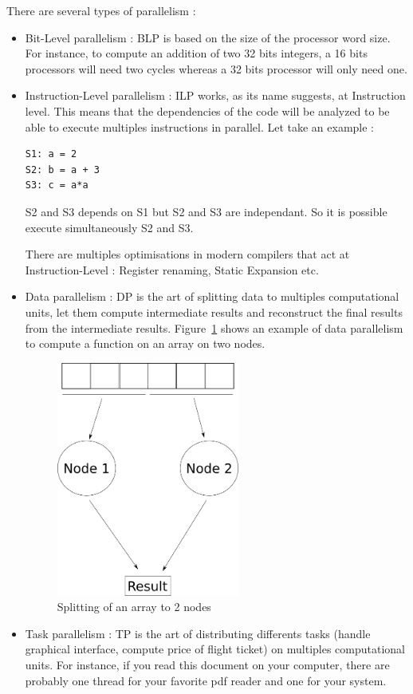 There are several types of parallelism :
\begin{itemize}
\item Bit-Level parallelism : BLP is based on the size of the processor word size. For instance, to compute an addition of two 32 bits integers, a 16 bits processors will need two cycles whereas a 32 bits processor will only need one.
\item Instruction-Level parallelism : ILP works, as its name suggests, at Instruction level. This means that the dependencies of the code will be analyzed to be able to execute multiples instructions in parallel. Let take an example :
\begin{lstlisting}
S1: a = 2
S2: b = a + 3
S3: c = a*a
\end{lstlisting}
S2 and S3 depends on S1 but S2 and S3 are independant. So it is possible execute simultaneously S2 and S3.

There are multiples optimisations in modern compilers that act at Instruction-Level : Register renaming, Static Expansion etc.
\item Data parallelism : DP is the art of splitting data to multiples computational units, let them compute intermediate results and reconstruct the final results from the intermediate results. Figure~\ref{fig:Data_Parallelism} shows an example of data parallelism to compute a function on an array on two nodes.
\begin{figure}
\centering
\includegraphics[width=6cm]{gfx/Parallelism/Data_Parallelism.png}
\caption{Splitting of an array to 2 nodes}
\label{fig:Data_Parallelism}
\end{figure}
\item Task parallelism : TP is the art of distributing differents tasks (handle graphical interface, compute price of flight ticket) on multiples computational units. For instance, if you read this document on your computer, there are probably one thread for your favorite pdf reader and one for your system. 
\end{itemize}

